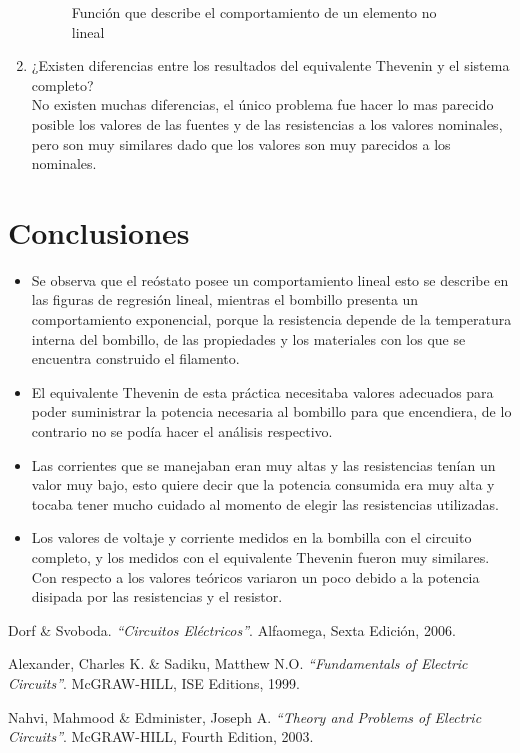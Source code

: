\documentclass[twocolumn]{IEEEtran}
\begin{document}
\begin{enumerate}
\begin{figure}[H]
	\caption{Función que describe el comportamiento de un elemento no lineal}
	\label{fig10}
\end{figure}
 \item ¿Existen diferencias entre los resultados del equivalente Thevenin y el sistema completo?\\
No existen muchas diferencias, el único problema fue hacer lo mas parecido posible los valores de las fuentes y de las resistencias a los valores nominales, pero son muy similares dado que los valores son muy parecidos a los nominales.
\end{enumerate}

\section{Conclusiones}
\begin{itemize}
 \item Se observa que el reóstato posee un comportamiento lineal esto se describe en las figuras de regresión lineal, mientras el bombillo presenta un comportamiento exponencial, porque la resistencia depende de la temperatura interna del bombillo, de las propiedades y los materiales con los que se encuentra construido el filamento.
 \item El equivalente Thevenin de esta práctica necesitaba valores adecuados para poder suministrar la potencia necesaria al bombillo para que encendiera, de lo contrario no se podía hacer el análisis respectivo.
 \item Las corrientes que se manejaban eran muy altas y las resistencias tenían un valor muy bajo, esto quiere decir que la potencia consumida era muy alta y tocaba tener mucho cuidado al momento de elegir las resistencias utilizadas.
 \item Los valores de voltaje y corriente medidos en la bombilla con el circuito completo, y los medidos con el equivalente Thevenin fueron muy similares. Con respecto a los valores teóricos variaron un poco debido a la potencia disipada por las resistencias y el resistor.
\end{itemize}


\begin{thebibliography}{99}
 Dorf  \& Svoboda.
{\em "`Circuitos Eléctricos"'}.
Alfaomega, Sexta Edición, 2006.

 Alexander, Charles K. \&  Sadiku, Matthew N.O.
{\em "`Fundamentals of Electric Circuits"'}.
McGRAW-HILL, ISE Editions, 1999.

 Nahvi, Mahmood \& Edminister, Joseph A.
{\em "`Theory and Problems of Electric Circuits"'}.
McGRAW-HILL, Fourth Edition, 2003.
\end{thebibliography}
\end{document}

